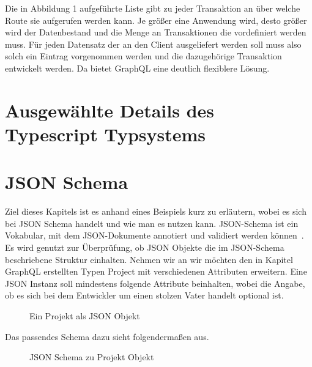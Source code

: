 Die in Abbildung 1 aufgeführte Liste gibt zu jeder Transaktion an über welche Route sie aufgerufen werden kann.
Je größer eine Anwendung wird, desto größer wird der Datenbestand und die Menge an Transaktionen die vordefiniert werden muss.
Für jeden Datensatz der an den Client ausgeliefert werden soll muss also solch ein Eintrag vorgenommen werden und die dazugehörige Transaktion entwickelt werden.
Da bietet GraphQL eine deutlich flexiblere Lösung.



\section{Ausgewählte Details des Typescript Typsystems}

\section{JSON Schema}
\label{sec:basics:jsonschema}
Ziel dieses Kapitels ist es anhand eines Beispiels kurz zu erläutern, wobei es sich bei JSON Schema handelt und wie man es nutzen kann.
JSON-Schema ist ein Vokabular, mit dem JSON-Dokumente  annotiert und validiert werden können~\cite{json-schema}.
Es wird genutzt zur Überprüfung, ob JSON Objekte die im JSON-Schema beschriebene Struktur einhalten.
Nehmen wir an wir möchten den in Kapitel GraphQL erstellten Typen Project mit verschiedenen Attributen erweitern.
Eine JSON Instanz soll mindestens folgende Attribute beinhalten, wobei die Angabe, ob es sich bei dem Entwickler
um einen stolzen Vater handelt optional ist.

\begin{figure}[h]
    
    \caption{Ein Projekt als JSON Objekt}
    \label{fig:basics:jsonschema:1}
\end{figure}

Das passendes Schema dazu sieht folgendermaßen aus.

\begin{figure}[h]
    
    \caption{JSON Schema zu Projekt Objekt}
    \label{fig:basics:jsonschema:2}
\end{figure}

